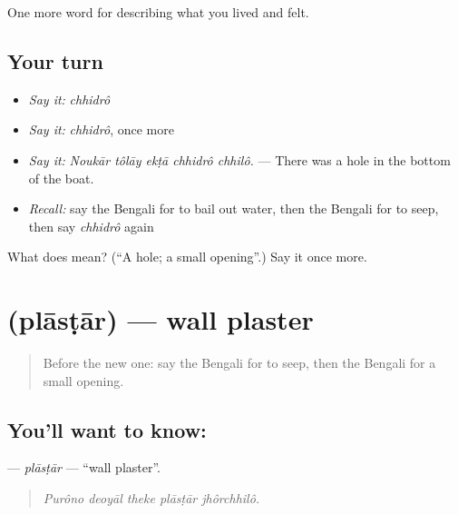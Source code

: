 \begin{grammarlens}[title={What you've built}]
One more word for describing what you lived and felt.
\end{grammarlens}

\subsection*{Your turn}
\begin{itemize}
\raggedright
  \item \emph{Say it:} \emph{chhidrô}
  \item \emph{Say it:} \emph{chhidrô}, once more
  \item \emph{Say it:} \emph{Noukār tôlāy ekṭā chhidrô chhilô.} — There was a hole in the bottom of the boat.
  \item \emph{Recall:} say the Bengali for to bail out water, then the Bengali for to seep, then say \emph{chhidrô} again
\end{itemize}

\begin{tcolorbox}[breakable,colback=teal!4,colframe=teal!35!black,title={Before you move on}]
What does  mean? (\textquotedblleft{}A hole; a small opening\textquotedblright{}.) Say it once more.
\end{tcolorbox}
\section[\texorpdfstring{\bn{প্লাস্টার} (plāsṭār)}{প্লাস্টার (plāsṭār)}]{ (plāsṭār) — wall plaster}

\label{lesson:BN-C507-plastar}



\begin{quote}
Before the new one: say the Bengali for to seep, then the Bengali for a small opening.
\end{quote}

\subsection*{You'll want to know: }
\textbf{} — \emph{plāsṭār} — \textquotedblleft{}wall plaster\textquotedblright{}.

\begin{quote}
    
\end{quote}

\begin{quote}
\emph{Purôno deoyāl theke plāsṭār jhôrchhilô.}
\end{quote}

